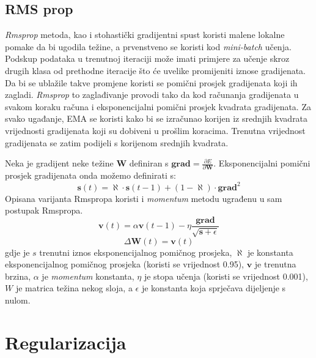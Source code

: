 \documentclass[times, utf8, diplomski, numeric]{fer}
\begin{document}
\subsection{RMS prop}

\emph{Rmsprop} metoda, kao i stohastički gradijentni spust koristi malene lokalne pomake da bi ugodila težine, a prvenstveno se koristi kod \textit{mini-batch} učenja.
Podskup podataka u trenutnoj iteraciji može imati primjere za učenje skroz drugih klasa od prethodne iteracije što će uvelike promijeniti iznose gradijenata. Da bi se ublažile takve promjene koristi se pomični prosjek gradijenata koji ih zagladi.
\emph{Rmsprop} to zaglađivanje provodi tako da kod računanja gradijenata u svakom koraku računa i eksponencijalni pomični prosjek  kvadrata gradijenata. Za svako ugađanje, EMA se koristi kako bi se izračunao korijen iz srednjih kvadrata  vrijednosti gradijenata koji su dobiveni u prošlim koracima. Trenutna vrijednost gradijenata se zatim podijeli s korijenom srednjih kvadrata.

Neka je gradijent neke težine $\boldsymbol{W}$ definiran s $\boldsymbol{grad} = \frac{\partial E}{\partial \boldsymbol{W}}$. Eksponencijalni pomični prosjek gradijenata onda možemo definirati s:
\begin{equation}
  \boldsymbol{s}(t) = \aleph \cdot \boldsymbol{s}(t-1) + (1 - \aleph) \cdot \boldsymbol{grad}^2
\end{equation}
Opisana varijanta Rmspropa \cite{Graves13} koristi i \emph{momentum} metodu ugrađenu u sam postupak Rmspropa.
\begin{equation} %
  \boldsymbol{v}(t) = \alpha \boldsymbol{v}(t-1) - \eta \frac{\boldsymbol{grad}}{\sqrt{\boldsymbol{s} + \epsilon}}
\end{equation}
\begin{equation} %
  \Delta \boldsymbol{W}(t) = \boldsymbol{v}(t)
\end{equation}
gdje je $s$ trenutni iznos eksponencijalnog pomičnog prosjeka, $\aleph$ je konstanta eksponencijalnog pomičnog prosjeka (koristi se vrijednost 0.95),  $\boldsymbol{v}$ je trenutna brzina, $\alpha$ je \emph{momentum} konstanta, $\eta$ je stopa učenja (koristi se vrijednost 0.001), $W$ je matrica težina nekog sloja, a $\epsilon$ je konstanta koja sprječava dijeljenje s nulom.


\section{Regularizacija}
\end{document}
